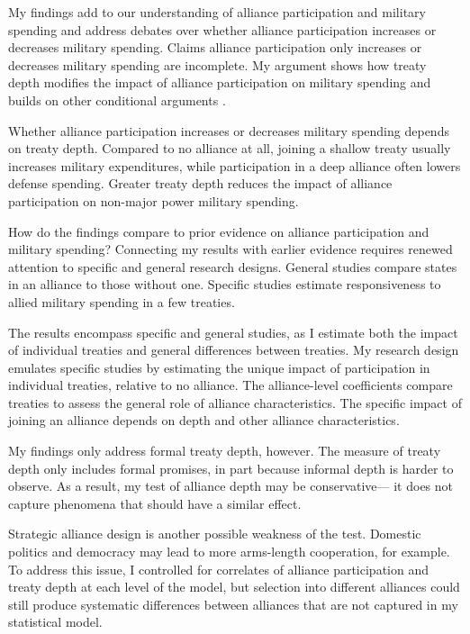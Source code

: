 \documentclass[12pt]{article}
\begin{document}
My findings add to our understanding of alliance participation and military spending and address debates over whether alliance participation increases or decreases military spending. 
Claims alliance participation only increases or decreases military spending are incomplete. 
My argument shows how treaty depth modifies the impact of alliance participation on military spending and builds on other conditional arguments \citep{DigiuseppePoast2016}. 


Whether alliance participation increases or decreases military spending depends on treaty depth. 
Compared to no alliance at all, joining a shallow treaty usually increases military expenditures, while participation in a deep alliance often lowers defense spending. 
Greater treaty depth reduces the impact of alliance participation on non-major power military spending. 


How do the findings compare to prior evidence on alliance participation and military spending? 
Connecting my results with earlier evidence requires renewed attention to specific and general research designs. 
General studies compare states in an alliance to those without one. 
Specific studies estimate responsiveness to allied military spending in a few treaties. 


The results encompass specific and general studies, as I estimate both the impact of individual treaties and general differences between treaties. 
My research design emulates specific studies by estimating the unique impact of participation in individual treaties, relative to no alliance. 
The alliance-level coefficients compare treaties to assess the general role of alliance characteristics.   
The specific impact of joining an alliance depends on depth and other alliance characteristics. 


My findings only address formal treaty depth, however. 
The measure of treaty depth only includes formal promises, in part because informal depth is harder to observe. 
As a result, my test of alliance depth may be conservative--- it does not capture phenomena that should have a similar effect. 


Strategic alliance design is another possible weakness of the test. 
Domestic politics \citep{Davis2004} and democracy \citep{Chibaetal2015} may lead to more arms-length cooperation, for example.   
To address this issue, I controlled for correlates of alliance participation and treaty depth at each level of the model, but selection into different alliances could still produce systematic differences between alliances that are not captured in my statistical model. 
\end{document}
